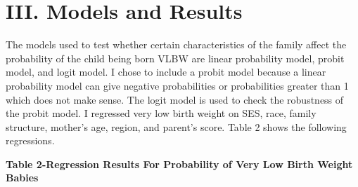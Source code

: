 \documentclass{article}
\begin{document}
\section*{III. Models and Results}

The models used to test whether certain characteristics of the family affect the probability of the child being born VLBW are linear probability model, probit model, and logit model. I chose to include a probit model because a linear probability model can give negative probabilities or probabilities greater than 1 which does not make sense. The logit model is used to check the robustness of the probit model. I regressed very low birth weight on SES, race, family structure, mother's age, region, and parent's score. Table 2 shows the following regressions. 

\begin{table}[H]
\centering 
\setlength\extrarowheight{-9pt}

\begin{threeparttable}
	
	\singlespace
	  \caption*{\textbf{Table 2-Regression Results For Probability of Very Low Birth Weight Babies}}
	  

\end{threeparttable}
\end{table}
\end{document}
